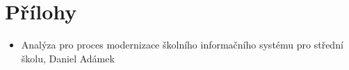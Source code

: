 \chapter{Přílohy}
\begin{itemize}
  \item Analýza pro proces modernizace školního informačního systému pro střední školu, Daniel Adámek
\end{itemize}